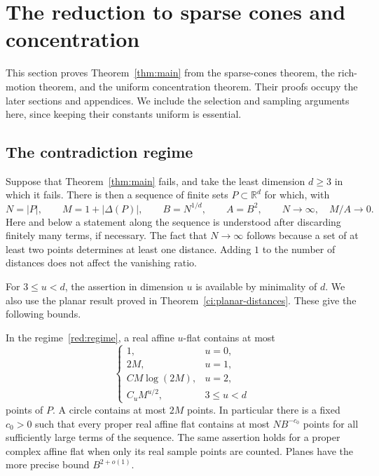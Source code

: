 \section{The reduction to sparse cones and concentration}
\label{sec:reduction}

This section proves Theorem~\ref{thm:main} from the sparse-cones theorem,
the rich-motion theorem, and the uniform concentration theorem.
Their proofs occupy the later sections and appendices. We include the
selection and sampling arguments here, since keeping their constants
uniform is essential.

\subsection{The contradiction regime}

Suppose that Theorem~\ref{thm:main} fails, and take the least dimension
\(d\ge3\) in which it fails. There is then a sequence of finite sets
\(P\subset\mathbb R^d\) for which, with
\begin{equation}\label{red:regime}
 N=|P|,\qquad M=1+|\Delta(P)|,\qquad
 B=N^{1/d},\qquad A=B^2,
 \qquad N\longrightarrow\infty,\quad M/A\longrightarrow0.
\end{equation}
Here and below a statement along the sequence is understood after
discarding finitely many terms, if necessary. The fact that
\(N\to\infty\) follows because a set of at least two points determines
at least one distance. Adding \(1\) to the number of distances does
not affect the vanishing ratio.

For \(3\le u<d\), the assertion in dimension \(u\) is available by
minimality of \(d\). We also use the planar result proved in
Theorem~\ref{ci:planar-distances}. These give the following bounds.

\begin{lemma}\label{red:flat-caps}
In the regime~\eqref{red:regime}, a real affine \(u\)-flat contains
at most
\[
 \begin{cases}
  1,&u=0,\\
  2M,&u=1,\\
  C M\log(2M),&u=2,\\
  C_u M^{u/2},&3\le u<d
 \end{cases}
\]
points of \(P\). A circle contains at most \(2M\) points.
In particular there is a fixed \(c_0>0\) such that every proper real
affine flat contains at most \(N B^{-c_0}\) points for all sufficiently
large terms of the sequence. The same assertion holds for a proper
complex affine flat when only its real sample points are counted.
Planes have the more precise bound \(B^{2+o(1)}\).
\end{lemma}

